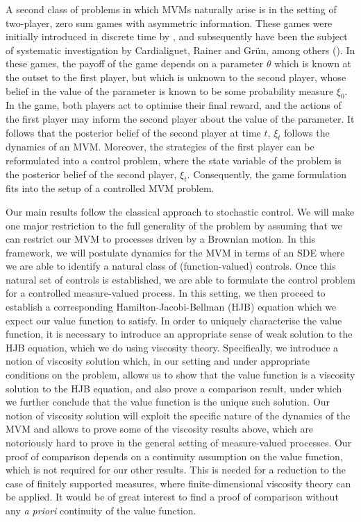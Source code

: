 \documentclass{article}
\theoremstyle{definition}
\numberwithin{equation}{section}
\numberwithin{theorem}{section}
\begin{document}
A second class of problems in which MVMs naturally arise is in the
setting of two-player, zero sum games with asymmetric
information. These games were initially introduced in discrete time by
\cite{aumann1995}, and subsequently have been the subject of
systematic investigation by Cardialiguet, Rainer and Gr\"un, among
others
(\cite{cardaliaguet_rainer2009_no_mvm,cardaliaguet_rainer2009,cardaliaguet2009,cardaliaguet2012,gensbittel2018,grun_dynkin_2013}). In
these games, the payoff of the game depends on a parameter $\theta$
which is known at the outset to the first player, but which is unknown
to the second player, whose belief in the value of the parameter is
known to be some probability measure $\xi_0$. In the game, both players
act to optimise their final reward, and the actions of the first player
may inform the second player about the value of the parameter. It
follows that the posterior belief of the second player at time $t$,
$\xi_t$ follows the dynamics of an MVM. Moreover, the strategies of
the first player can be reformulated into a control problem, where the
state variable of the problem is the posterior belief of the second
player, $\xi_t$. Consequently, the game formulation fits into the
setup of a controlled MVM problem. 

Our main results follow the classical approach to stochastic
control. We will make one major restriction to the full generality of
the problem by assuming that we can restrict our MVM to processes
driven by a Brownian motion. In this framework, we will postulate
dynamics for the MVM in terms of an SDE where we are able to identify
a natural class of (function-valued) controls. Once this natural set
of controls is established, we are able to formulate the control
problem for a controlled measure-valued process. In this setting, we
then proceed to establish a corresponding Hamilton-Jacobi-Bellman
(HJB) equation which we expect our value function to satisfy. In order
to uniquely characterise the value function, it is necessary to
introduce an appropriate sense of weak solution to the HJB equation,
which we do using viscosity theory. Specifically, we introduce a
notion of viscosity solution which, in our setting and under
appropriate conditions on the problem, allows us to show that the
value function is a viscosity solution to the HJB equation, and also
prove a comparison result, under which we further conclude that the
value function is the unique such solution. Our notion of viscosity
solution will exploit the specific nature of the dynamics of the MVM
and allows to prove some of the viscosity results above, which are
notoriously hard to prove in the general setting of measure-valued
processes. Our proof of comparison depends on a continuity assumption on the value function, which is not required for our other results. This is needed for a reduction to the case of finitely supported measures, where finite-dimensional viscosity theory can be applied. It would be of great interest to find a proof of comparison without any \emph{a priori} continuity of the value function.
\end{document}
